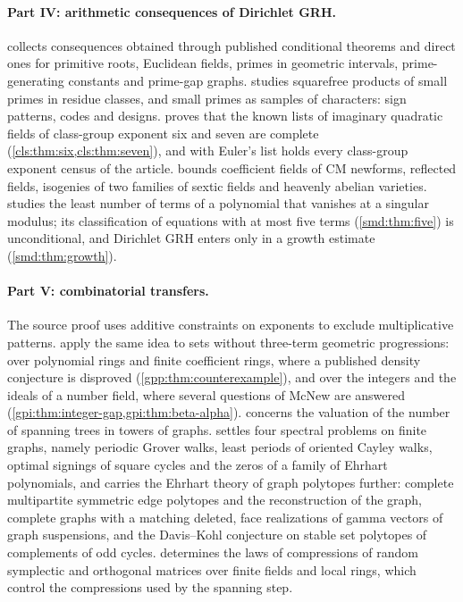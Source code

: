 \paragraph{Part IV: arithmetic consequences of Dirichlet GRH.}
 collects consequences obtained through published conditional theorems and
direct ones for primitive roots, Euclidean fields, primes in geometric intervals,
prime-generating constants and prime-gap graphs.  studies squarefree products
of small primes in residue classes, and small primes as samples of characters: sign patterns,
codes and designs.  proves that the known lists of imaginary quadratic fields of
class-group exponent six and seven are complete (\cref{cls:thm:six,cls:thm:seven}), and with
Euler's list holds every class-group exponent census of the article.  bounds
coefficient fields of CM newforms, reflected fields, isogenies of two families of sextic
fields and heavenly abelian varieties.  studies the least number of terms of a
polynomial that vanishes at a singular modulus; its classification of equations with at most
five terms (\cref{smd:thm:five}) is unconditional, and Dirichlet GRH enters only in a growth
estimate (\cref{smd:thm:growth}).

\paragraph{Part V: combinatorial transfers.}
The source proof uses additive constraints on exponents to exclude multiplicative patterns.
 apply the same idea to sets without three-term geometric progressions:
over polynomial rings and finite coefficient rings, where a published density conjecture is
disproved (\cref{gpp:thm:counterexample}), and over the integers and the ideals of a number
field, where several questions of McNew are answered
(\cref{gpi:thm:integer-gap,gpi:thm:beta-alpha}).  concerns the valuation of
the number of spanning trees in towers of graphs.  settles four spectral
problems on finite graphs, namely periodic Grover walks, least periods of oriented Cayley walks,
optimal signings of square cycles and the zeros of a family of Ehrhart polynomials, and carries
the Ehrhart theory of graph polytopes further: complete multipartite symmetric edge polytopes and
the reconstruction of the graph, complete graphs with a matching deleted, face realizations of
gamma vectors of graph suspensions, and the Davis--Kohl conjecture on stable set polytopes of
complements of odd cycles.
 determines the laws of compressions of random symplectic and orthogonal
matrices over finite fields and local rings, which control the compressions used by the
spanning step.

